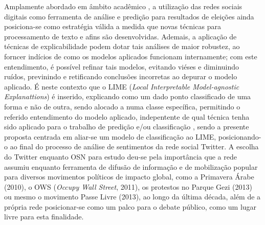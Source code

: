 \par
Amplamente abordado em âmbito acadêmico \cite{shevtsov2020analysis,zahrah2022comparison,chaudhry2021sentiment,takikawa2017political,xia2021tweet}, a utilização das redes sociais digitais como ferramenta de análise e predição para resultados de eleições ainda posiciona-se como estratégia válida a medida que novas técnicas para processamento de texto e afins são desenvolvidas. Ademais, a aplicação de técnicas de explicabilidade podem dotar tais análises de maior robustez, ao forncer indícios de como os modelos aplicados funcionam internamente; com este entendimento, é possível refinar tais modelos, evitando viéses e diminuindo ruídos, previnindo e retificando conclusões incorretas ao depurar o modelo aplicado. É neste contexto que o LIME (\textit{Local Interpretable Model-agnostic Explanattions}) é inserido, explicando como um dado ponto classificado de uma forma e não de outra, sendo alocado a numa classe específica, permitindo o referido entendimento do modelo aplicado, indepentente de qual técnica tenha sido aplicado para o trabalho de predição e/ou classificação \cite{confalonieri2021historical,lovera2021sentiment}, sendo a presente proposta centrada em aliar-se um modelo de classificação ao LIME, posicionando-o ao final do processo de análise de sentimentos da rede social Twitter.
A escolha do Twitter enquanto OSN para estudo deu-se pela importância que a rede assumiu enquanto ferramenta de difusão de informação e de mobilização popular para diversos movimentos políticos de impacto global, como a Primavera Árabe (2010), o OWS (\textit{Occupy Wall Street}, 2011), os protestos no Parque Gezi (2013) \cite{takikawa2017political} ou mesmo o movimento Passe Livre (2013), ao longo da última década, além de a própria rede posicionar-se como um palco para o debate público, como um lugar livre para esta finalidade.